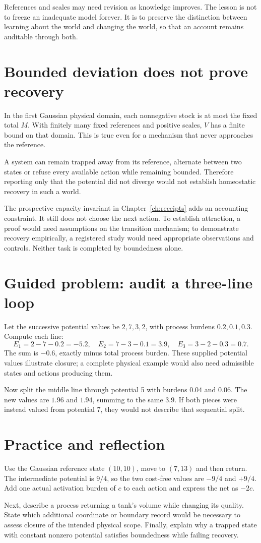 References and scales may need revision as knowledge improves. The lesson is not to freeze an inadequate model forever. It is to preserve the distinction between learning about the world and changing the world, so that an account remains auditable through both.

\section{Bounded deviation does not prove recovery}
In the first Gaussian physical domain, each nonnegative stock is at most the fixed total $M$. With finitely many fixed references and positive scales, $V$ has a finite bound on that domain. This is true even for a mechanism that never approaches the reference.

A system can remain trapped away from its reference, alternate between two states or refuse every available action while remaining bounded. Therefore reporting only that the potential did not diverge would not establish homeostatic recovery in such a world.

The prospective capacity invariant in Chapter~\ref{ch:receipts} adds an accounting constraint. It still does not choose the next action. To establish attraction, a proof would need assumptions on the transition mechanism; to demonstrate recovery empirically, a registered study would need appropriate observations and controls. Neither task is completed by boundedness alone.

\section{Guided problem: audit a three-line loop}
Let the successive potential values be $2,7,3,2$, with process burdens $0.2,0.1,0.3$. Compute each line:
\[
 E_1=2-7-0.2=-5.2,\quad
 E_2=7-3-0.1=3.9,\quad
 E_3=3-2-0.3=0.7.
\]
The sum is $-0.6$, exactly minus total process burden. These supplied potential values illustrate closure; a complete physical example would also need admissible states and actions producing them.

Now split the middle line through potential 5 with burdens $0.04$ and $0.06$. The new values are $1.96$ and $1.94$, summing to the same $3.9$. If both pieces were instead valued from potential 7, they would not describe that sequential split.

\section{Practice and reflection}
Use the Gaussian reference state $(10,10)$, move to $(7,13)$ and then return. The intermediate potential is $9/4$, so the two cost-free values are $-9/4$ and $+9/4$. Add one actual activation burden of $c$ to each action and express the net as $-2c$.

Next, describe a process returning a tank's volume while changing its quality. State which additional coordinate or boundary record would be necessary to assess closure of the intended physical scope. Finally, explain why a trapped state with constant nonzero potential satisfies boundedness while failing recovery.
